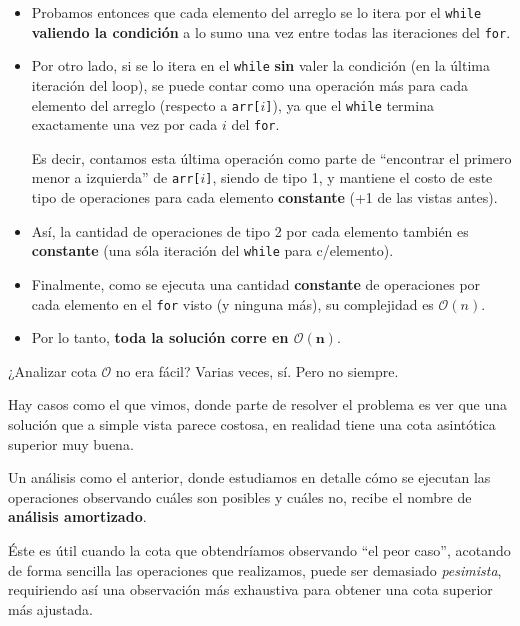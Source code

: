 \documentclass{beamer}
\begin{document}
    \begin{frame}[noframenumbering]
        \begingroup
        \setlength{\leftmargini}{16pt}
        \begin{itemize}
            \item Probamos entonces que cada elemento del arreglo se lo itera por el \texttt{while} \textbf{valiendo la condición} a lo sumo una vez entre todas las iteraciones del \texttt{for}.\pause 

            \item Por otro lado, si se lo itera en el \texttt{while} \textbf{sin} valer la condición (en la última iteración del loop), se puede contar como una operación más para cada elemento del arreglo (respecto a \texttt{arr[$i$]}), ya que el \texttt{while} termina exactamente una vez por cada $i$ del \texttt{for}. \pause

        Es decir, contamos esta última operación como parte de ``encontrar el primero menor a izquierda'' de \texttt{arr[$i$]}, siendo de tipo 1, y mantiene el costo de este tipo de operaciones para cada elemento \textbf{constante} (+1 de las vistas antes). \pause

            \item Así, la cantidad de operaciones de tipo 2 por cada elemento también es \textbf{constante} (una sóla iteración del \texttt{while} para c/elemento). \pause

            \item Finalmente, como se ejecuta una cantidad \textbf{constante} de operaciones por cada elemento en el \texttt{for} visto (y ninguna más), su complejidad es $\mathcal{O}(n)$. \pause

            \item Por lo tanto, \textbf{toda la solución corre en $\bm{\mathcal{O}(n)}$}.
        \end{itemize}
        \endgroup
    \end{frame}

    \begin{frame}{¿Analizar cota $\mathcal{O}$ no era fácil?}
        Varias veces, sí. Pero no siempre. \pause \vspace{4pt}

        Hay casos como el que vimos, donde parte de resolver el problema es ver que una solución que a simple vista parece costosa, en realidad tiene una cota asintótica superior muy buena. \pause \vspace{4pt}

        Un análisis como el anterior, donde estudiamos en detalle cómo se ejecutan las operaciones observando cuáles son posibles y cuáles no, recibe el nombre de \textbf{análisis amortizado}. \pause 

        Éste es útil cuando la cota que obtendríamos observando ``el peor caso'', acotando de forma sencilla las operaciones que realizamos, puede ser demasiado \textit{pesimista}, requiriendo así una observación más exhaustiva para obtener una cota superior más ajustada.
    \end{frame}
\end{document}
